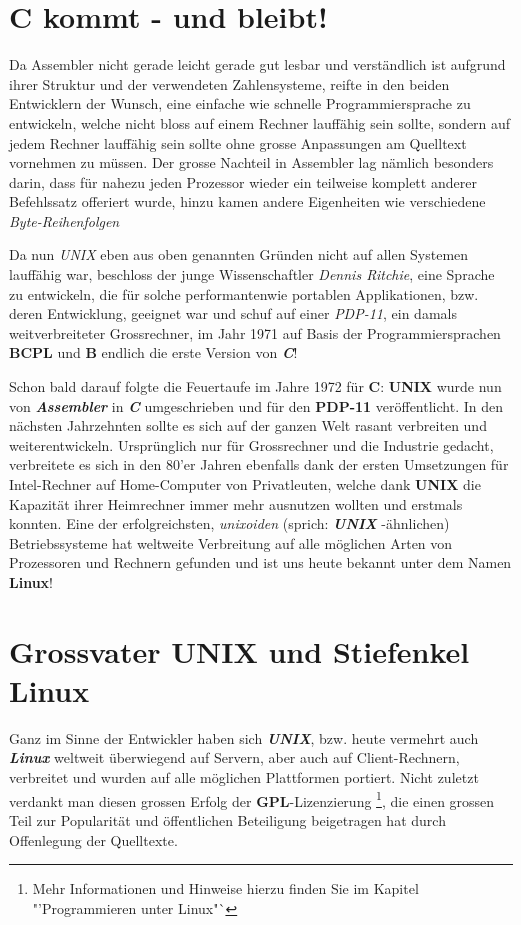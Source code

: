 \documentclass[b5paper,10pt,dvips,fleqn,titlepage,twoside]{book}
\begin{document}
\section{C kommt - und bleibt!}
Da Assembler nicht gerade leicht gerade gut lesbar und verständlich ist aufgrund ihrer Struktur und der verwendeten Zahlensysteme, reifte in den beiden Entwicklern der Wunsch, eine einfache wie schnelle Programmiersprache zu entwickeln, welche nicht bloss auf einem Rechner lauffähig sein sollte, sondern auf jedem Rechner lauffähig sein sollte ohne grosse Anpassungen am Quelltext vornehmen zu müssen.\newline
Der grosse Nachteil in Assembler lag nämlich besonders darin, dass für nahezu jeden Prozessor wieder ein teilweise komplett anderer Befehlssatz offeriert wurde, hinzu kamen andere Eigenheiten wie verschiedene \textit{Byte-Reihenfolgen}

Da nun \emph{UNIX} eben aus oben genannten Gründen nicht auf allen Systemen lauffähig war, beschloss der junge Wissenschaftler \emph{Dennis Ritchie}, eine Sprache zu entwickeln, die für solche performantenwie portablen Applikationen, bzw. deren Entwicklung, geeignet war und schuf auf einer \emph{PDP-11}, ein damals weitverbreiteter Grossrechner, im Jahr 1971 auf Basis der Programmiersprachen \textbf{BCPL} und \textbf{B} endlich die erste Version von \emph{\textbf{C}}!

Schon bald darauf folgte die Feuertaufe im Jahre 1972 für \textbf{C}: \textbf{UNIX} wurde nun von \emph{\textbf{Assembler}} in \emph{\textbf{C}} umgeschrieben und für den \textbf{PDP-11} veröffentlicht.\newline
In den nächsten Jahrzehnten sollte es sich auf der ganzen Welt rasant verbreiten und weiterentwickeln. Ursprünglich nur für Grossrechner und die Industrie gedacht, verbreitete es sich in den 80'er Jahren ebenfalls dank der ersten Umsetzungen für Intel-Rechner auf Home-Computer von Privatleuten, welche dank \textbf{UNIX} die Kapazität ihrer Heimrechner immer mehr ausnutzen wollten und erstmals konnten. Eine der erfolgreichsten, \textit{unixoiden} (sprich: \emph{\textbf{UNIX}	}-ähnlichen) Betriebssysteme hat weltweite Verbreitung auf alle möglichen Arten von Prozessoren und Rechnern gefunden und ist uns heute bekannt unter dem Namen \textbf{Linux}!
\section{Grossvater UNIX und Stiefenkel Linux}
Ganz im Sinne der Entwickler haben sich \emph{\textbf{UNIX}}, bzw. heute vermehrt auch \emph{\textbf{Linux}} weltweit überwiegend auf Servern, aber auch auf Client-Rechnern, verbreitet und wurden auf alle möglichen Plattformen portiert. Nicht zuletzt verdankt man diesen grossen Erfolg  der \textbf{GPL}-Lizenzierung \footnote{Mehr Informationen und Hinweise hierzu finden Sie im Kapitel "'Programmieren unter Linux"`}, die einen grossen Teil zur Popularität und öffentlichen Beteiligung beigetragen hat durch Offenlegung der Quelltexte.
\end{document}

